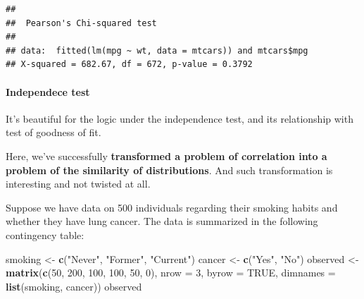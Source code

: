 \documentclass[
]{ctexart}
\newenvironment{Shaded}{\begin{snugshade}}{\end{snugshade}}
\newcommand{\AttributeTok}[1]{\textcolor[rgb]{0.13,0.29,0.53}{#1}}
\newcommand{\ConstantTok}[1]{\textcolor[rgb]{0.56,0.35,0.01}{#1}}
\newcommand{\DecValTok}[1]{\textcolor[rgb]{0.00,0.00,0.81}{#1}}
\newcommand{\FunctionTok}[1]{\textcolor[rgb]{0.13,0.29,0.53}{\textbf{#1}}}
\newcommand{\NormalTok}[1]{#1}
\newcommand{\OtherTok}[1]{\textcolor[rgb]{0.56,0.35,0.01}{#1}}
\newcommand{\SpecialCharTok}[1]{\textcolor[rgb]{0.81,0.36,0.00}{\textbf{#1}}}
\newcommand{\StringTok}[1]{\textcolor[rgb]{0.31,0.60,0.02}{#1}}
\begin{document}
\begin{Shaded}
\end{Shaded}

\begin{verbatim}
## 
##  Pearson's Chi-squared test
## 
## data:  fitted(lm(mpg ~ wt, data = mtcars)) and mtcars$mpg
## X-squared = 682.67, df = 672, p-value = 0.3792
\end{verbatim}

\hypertarget{independece-test}{%
\paragraph{Independece test}\label{independece-test}}

It's beautiful for the logic under the independence test, and its
relationship with test of goodness of fit.

Here, we've successfully \textbf{transformed a problem of correlation
into a problem of the similarity of distributions}. And such
transformation is interesting and not twisted at all.

Suppose we have data on 500 individuals regarding their smoking habits
and whether they have lung cancer. The data is summarized in the
following contingency table:

\begin{Shaded}
\begin{Highlighting}[]
\NormalTok{smoking }\OtherTok{\textless{}{-}} \FunctionTok{c}\NormalTok{(}\StringTok{"Never"}\NormalTok{, }\StringTok{"Former"}\NormalTok{, }\StringTok{"Current"}\NormalTok{)}
\NormalTok{cancer }\OtherTok{\textless{}{-}} \FunctionTok{c}\NormalTok{(}\StringTok{"Yes"}\NormalTok{, }\StringTok{"No"}\NormalTok{)}
\NormalTok{observed }\OtherTok{\textless{}{-}} \FunctionTok{matrix}\NormalTok{(}\FunctionTok{c}\NormalTok{(}\DecValTok{50}\NormalTok{, }\DecValTok{200}\NormalTok{, }\DecValTok{100}\NormalTok{, }\DecValTok{100}\NormalTok{, }\DecValTok{50}\NormalTok{, }\DecValTok{0}\NormalTok{),}
                   \AttributeTok{nrow =} \DecValTok{3}\NormalTok{, }\AttributeTok{byrow =} \ConstantTok{TRUE}\NormalTok{,}
                   \AttributeTok{dimnames =} \FunctionTok{list}\NormalTok{(smoking, cancer))}
\NormalTok{observed}
\end{Highlighting}
\end{Shaded}
\end{document}
